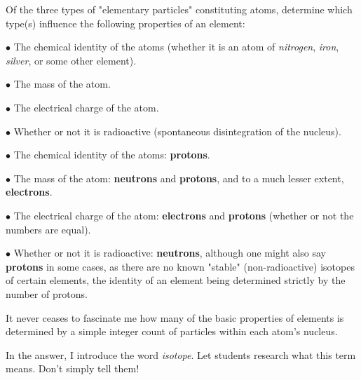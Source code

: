 

Of the three types of "elementary particles" constituting atoms, determine which type(s) influence the following properties of an element:

\vskip 10pt

\item {$\bullet$} The chemical identity of the atoms (whether it is an atom of {\it nitrogen}, {\it iron}, {\it silver}, or some other element).
\item {$\bullet$} The mass of the atom.
\item {$\bullet$} The electrical charge of the atom.
\item {$\bullet$} Whether or not it is radioactive (spontaneous disintegration of the nucleus).

\vskip 10pt







\item {$\bullet$} The chemical identity of the atoms: {\bf protons}.
\item {$\bullet$} The mass of the atom: {\bf neutrons} and {\bf protons}, and to a much lesser extent, {\bf electrons}.
\item {$\bullet$} The electrical charge of the atom: {\bf electrons} and {\bf protons} (whether or not the numbers are equal).
\item {$\bullet$} Whether or not it is radioactive: {\bf neutrons}, although one might also say {\bf protons} in some cases, as there are no known "stable" (non-radioactive) isotopes of certain elements, the identity of an element being determined strictly by the number of protons.







It never ceases to fascinate me how many of the basic properties of elements is determined by a simple integer count of particles within each atom's nucleus.

In the answer, I introduce the word {\it isotope}.  Let students research what this term means.  Don't simply tell them!




